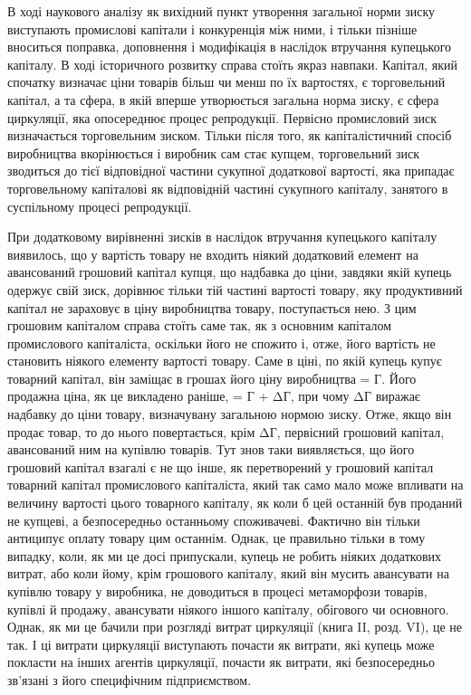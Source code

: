 В ході наукового аналізу як вихідний пункт утворення загальної
норми зиску виступають промислові капітали і конкуренція
між ними, і тільки пізніше вноситься поправка, доповнення і модифікація
в наслідок втручання купецького капіталу. В ході історичного
розвитку справа стоїть якраз навпаки. Капітал, який спочатку
визначає ціни товарів більш чи менш по їх вартостях, є торговельний
капітал, а та сфера, в якій вперше утворюється загальна
норма зиску, є сфера циркуляції, яка опосереднює процес репродукції.
Первісно промисловий зиск визначається торговельним
зиском. Тільки після того, як капіталістичний спосіб виробництва
вкорінюється і виробник сам стає купцем, торговельний зиск
зводиться до тієї відповідної частини сукупної додаткової вартості,
яка припадає торговельному капіталові як відповідній
частині сукупного капіталу, занятого в суспільному процесі репродукції.

При додатковому вирівненні зисків в наслідок втручання
купецького капіталу виявилось, що у вартість товару не входить
ніякий додатковий елемент на авансований грошовий капітал
купця, що надбавка до ціни, завдяки якій купець одержує
свій зиск, дорівнює тільки тій частині вартості товару, яку
продуктивний капітал не зараховує в ціну виробництва товару,
поступається нею. З цим грошовим капіталом справа стоїть
саме так, як з основним капіталом промислового капіталіста,
оскільки його не спожито і, отже, його вартість не становить
ніякого елементу вартості товару. Саме в ціні, по якій купець
купує товарний капітал, він заміщає в грошах його ціну виробництва
= Г. Його продажна ціна, як це викладено раніше, = Г + ΔГ, при чому ΔГ виражає надбавку до ціни
товару,
визначувану загальною нормою зиску. Отже, якщо він продає
товар, то до нього повертається, крім ΔГ, первісний грошовий
капітал, авансований ним на купівлю товарів. Тут знов таки
виявляється, що його грошовий капітал взагалі є не що інше,
як перетворений у грошовий капітал товарний капітал промислового
капіталіста, який так само мало може впливати на величину
вартості цього товарного капіталу, як коли б цей останній
був проданий не купцеві, а безпосередньо останньому споживачеві.
Фактично він тільки антиципує оплату товару цим
останнім. Однак, це правильно тільки в тому випадку, коли, як
ми це досі припускали, купець не робить ніяких додаткових
витрат, або коли йому, крім грошового капіталу, який він мусить
авансувати на купівлю товару у виробника, не доводиться
в процесі метаморфози товарів, купівлі й продажу, авансувати
ніякого іншого капіталу, обігового чи основного. Однак, як ми
це бачили при розгляді витрат циркуляції (книга II, розд. VI),
це не так. І ці витрати циркуляції виступають почасти як витрати,
які купець може покласти на інших агентів циркуляції,
почасти як витрати, які безпосередньо зв’язані з його специфічним
підприємством.
